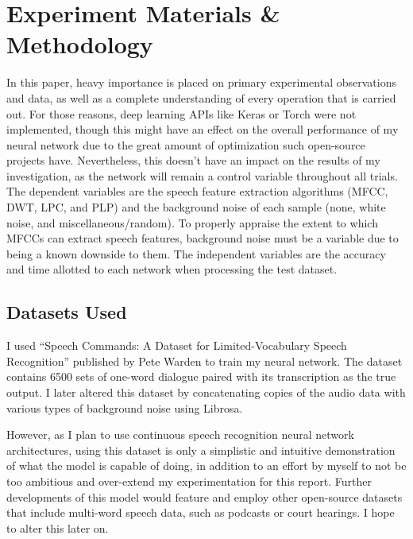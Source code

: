 
\chapter{Experiment Materials \& Methodology} %

\label{ExperimentMaterialsMethodology} %

In this paper, heavy importance is placed on primary experimental observations and data, as well as a complete understanding of every operation that is carried out. For those reasons, deep learning APIs like Keras or Torch were not implemented, though this might have an effect on the overall performance of my neural network due to the great amount of optimization such open-source projects have. Nevertheless, this doesn’t have an impact on the results of my investigation, as the network will remain a control variable throughout all trials. The dependent variables are the speech feature extraction algorithms (MFCC, DWT, LPC, and PLP) and the background noise of each sample (none, white noise, and miscellaneous/random). To properly appraise the extent to which MFCCs can extract speech features, background noise must be a variable due to being a known downside to them. The independent variables are the accuracy and time allotted to each network when processing the test dataset. 


\section{Datasets Used}

I used “Speech Commands: A Dataset for Limited-Vocabulary Speech Recognition” published by Pete Warden to train my neural network. The dataset contains 6500 sets of one-word dialogue paired with its transcription as the true output. I later altered this dataset by concatenating copies of the audio data with various types of background noise using Librosa.
\newline\par
However, as I plan to use continuous speech recognition neural network architectures, using this dataset is only a simplistic and intuitive demonstration of what the model is capable of doing, in addition to an effort by myself to not be too ambitious and over-extend my experimentation for this report. Further developments of this model would feature and employ other open-source datasets that include multi-word speech data, such as podcasts or court hearings. I hope to alter this later on.


